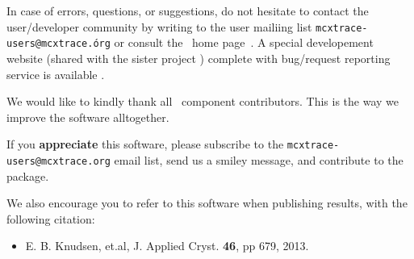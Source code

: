 In case of errors, questions, or suggestions,
do not hesitate to
contact the user/developer community by writing to the user mailiing list \verb+mcxtrace-users@mcxtrace.órg+
or consult the \MCX\ home page~\cite{mcxtrace_webpage}. A special developement
website (shared with the sister project \MCS) complete with bug/request
reporting service is available \cite{trac_webpage}.

We would like to kindly thank all \MCX\ component contributors. This is the way we improve the software alltogether.

If you {\bfseries appreciate} this software, please subscribe to the \verb+mcxtrace-users@mcxtrace.org+ email list, send us a smiley message, and contribute to the package.

We also encourage you to refer to this software when publishing results, with the following citation:
\begin{itemize}
\item{E. B. Knudsen, et.al, J. Applied Cryst. {\bfseries 46}, pp 679, 2013.}
\end{itemize}






